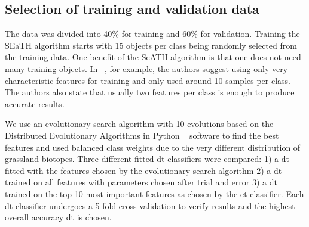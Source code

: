 \documentclass[authoryear,preprint,12pt,number]{elsarticle}
\begin{document}
\subsection{Selection of training and validation data}
The data was divided into 40\% for training and 60\% for validation. 
Training the SEaTH algorithm starts with 15 objects per class being randomly 
selected from the training data. One benefit of the SeATH algorithm is that one 
does not need many training objects. In ~\cite{Nussbaum2006}, for example, the 
authors suggest using only very characteristic features for training and only 
used around 10 samples per class. The authors also state that usually two 
features per class is enough to produce accurate results.

We use an evolutionary search algorithm with 10 evolutions based on the 
Distributed Evolutionary Algorithms in Python ~\citep{DEAP_JMLR2012} software 
to find the best features and used balanced class weights due to the very 
different distribution of grassland biotopes.  Three different fitted \gls{dt} 
classifiers were compared: 1) a \gls{dt} fitted with the features chosen by the 
evolutionary search algorithm 2) a \gls{dt} trained on all features with 
parameters chosen after trial and error 3) a \gls{dt} trained on the top 10 
most important features as chosen by the \gls{et} classifier. Each \gls{dt} 
classifier undergoes a 5-fold cross validation to verify results and the 
highest overall accuracy \gls{dt} is chosen.
\label{subsec:rulegen_data_mining}
\end{document}
